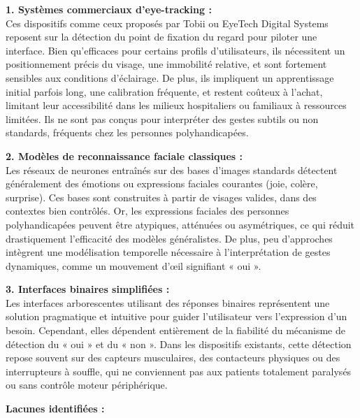 \documentclass[
]{article}
\begin{document}
\textbf{1. Systèmes commerciaux d'eye-tracking :\\
} Ces dispositifs comme ceux proposés par Tobii ou EyeTech Digital Systems reposent sur la détection du point de fixation du regard pour piloter une interface. Bien qu'efficaces pour certains profils d'utilisateurs, ils nécessitent un positionnement précis du visage, une immobilité relative, et sont fortement sensibles aux conditions d'éclairage. De plus, ils impliquent un apprentissage initial parfois long, une calibration fréquente, et restent coûteux à l'achat, limitant leur accessibilité dans les milieux hospitaliers ou familiaux à ressources limitées. Ils ne sont pas conçus pour interpréter des gestes subtils ou non standards, fréquents chez les personnes polyhandicapées.

\textbf{2. Modèles de reconnaissance faciale classiques :\\
} Les réseaux de neurones entraînés sur des bases d'images standards détectent généralement des émotions ou expressions faciales courantes (joie, colère, surprise). Ces bases sont construites à partir de visages valides, dans des contextes bien contrôlés. Or, les expressions faciales des personnes polyhandicapées peuvent être atypiques, atténuées ou asymétriques, ce qui réduit drastiquement l'efficacité des modèles généralistes. De plus, peu d'approches intègrent une modélisation temporelle nécessaire à l'interprétation de gestes dynamiques, comme un mouvement d'œil signifiant « oui ».

\textbf{3. Interfaces binaires simplifiées :\\
} Les interfaces arborescentes utilisant des réponses binaires représentent une solution pragmatique et intuitive pour guider l'utilisateur vers l'expression d'un besoin. Cependant, elles dépendent entièrement de la fiabilité du mécanisme de détection du « oui » et du « non ». Dans les dispositifs existants, cette détection repose souvent sur des capteurs musculaires, des contacteurs physiques ou des interrupteurs à souffle, qui ne conviennent pas aux patients totalement paralysés ou sans contrôle moteur périphérique.

\textbf{Lacunes identifiées :}
\end{document}
